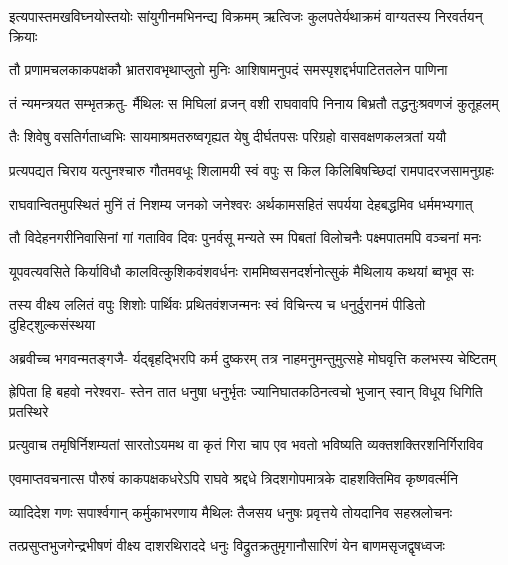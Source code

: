 \fourlineindentedshloka
{इत्यपास्तमखविघ्नयोस्तयोः}
{सांयुगीनमभिनन्द्य विक्रमम्}
{ऋत्विजः कुलपतेर्यथाक्रमं}
{वाग्यतस्य निरवर्तयन् क्रियाः} %

\twolineshloka
{तौ प्रणामचलकाकपक्षकौ भ्रातरावभृथाप्लुतो मुनिः}
{आशिषामनुपदं समस्पृशद्दर्भपाटिततलेन पाणिना} %

\fourlineindentedshloka
{तं न्यमन्त्रयत सम्भृतक्रतु-}
{र्मैथिलः स मिघिलां व्रजन् वशी}
{राघवावपि निनाय बिभ्रतौ}
{तद्धनुःश्रवणजं कुतूहलम्} %

\fourlineindentedshloka
{तैः शिवेषु वसतिर्गताध्वभिः}
{सायमाश्रमतरुष्वगृह्यत}
{येषु दीर्घतपसः परिग्रहो}
{वासवक्षणकलत्रतां ययौ} %

\twolineshloka
{प्रत्यपद्यत चिराय यत्पुनश्चारु गौतमवधूः शिलामयी}
{स्वं वपुः स किल किलिबिषच्छिदां रामपादरजसामनुग्रहः} %

\twolineshloka
{राघवान्वितमुपस्थितं मुनिं तं निशम्य जनको जनेश्वरः}
{अर्थकामसहितं सपर्यया देहबद्धमिव धर्ममभ्यगात्} %

\fourlineindentedshloka
{तौ विदेहनगरीनिवासिनां}
{गां गताविव दिवः पुनर्वसू}
{मन्यते स्म पिबतां विलोचनैः}
{पक्ष्मपातमपि वञ्चनां मनः} %

\fourlineindentedshloka
{यूपवत्यवसिते किर्याविधौ}
{कालवित्कुशिकवंशवर्धनः}
{राममिष्वसनदर्शनोत्सुकं}
{मैथिलाय कथयां ब्वभूव सः} %

\twolineshloka
{तस्य वीक्ष्य ललितं वपुः शिशोः पार्थिवः प्रथितवंशजन्मनः}
{स्वं विचिन्त्य च धनुर्दुरानमं पीडितो दुहिट्शुल्कसंस्थया} %

\fourlineindentedshloka
{अब्रवीच्च भगवन्मतङ्गजै-}
{र्यद्बृहद्भिरपि कर्म दुष्करम्}
{तत्र नाहमनुमन्तुमुत्सहे}
{मोघवृत्ति कलभस्य चेष्टितम्} %

\fourlineindentedshloka
{ह्रेपिता हि बहवो नरेश्वरा-}
{स्तेन तात धनुषा धनुर्भृतः}
{ज्यानिघातकठिनत्वचो भुजान्}
{स्वान् विधूय धिगिति प्रतस्थिरे} %

\fourlineindentedshloka
{प्रत्युवाच तमृषिर्निशम्यतां}
{सारतोऽयमथ वा कृतं गिरा}
{चाप एव भवतो भविष्यति}
{व्यक्तशक्तिरशनिर्गिराविव} %

\fourlineindentedshloka
{एवमाप्तवचनात्स पौरुषं}
{काकपक्षकधरेऽपि राघवे}
{श्रद्दधे त्रिदशगोपमात्रके}
{दाहशक्तिमिव कृष्णवर्त्मनि} %

\fourlineindentedshloka
{व्यादिदेश गणः सपार्श्वगान्}
{कर्मुकाभरणाय मैथिलः}
{तैजसय धनुषः प्रवृत्तये}
{तोयदानिव सहस्रलोचनः} %

\fourlineindentedshloka
{तत्प्रसुप्तभुजगेन्द्रभीषणं}
{वीक्ष्य दाशरथिराददे धनुः}
{विद्रुतक्रतुमृगानौसारिणं}
{येन बाणमसृजद्वृषध्वजः} %

